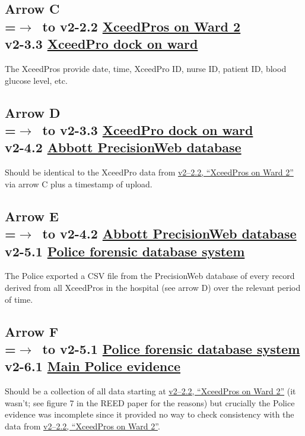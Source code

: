 \subsection*{Arrow  C\\
=\hbox{$\rightarrow$~}\hbox to v2-2.2 \hyperlink{4}{XceedPros on Ward 2}\\v2-3.3 \hyperlink{5}{XceedPro dock on ward}}
The XceedPros provide date, time, XceedPro ID, nurse ID, patient ID, blood glucose level, etc.
\subsection*{Arrow  D\\
=\hbox{$\rightarrow$~}\hbox to v2-3.3 \hyperlink{5}{XceedPro dock on ward}\\v2-4.2 \hyperlink{7}{Abbott PrecisionWeb database}}
Should be identical to the XceedPro data from \hyperlink{4}{{v2--2.2}, ``XceedPros on Ward 2''} via arrow C plus a timestamp of upload.
\subsection*{Arrow  E\\
=\hbox{$\rightarrow$~}\hbox to v2-4.2 \hyperlink{7}{Abbott PrecisionWeb database}\\v2-5.1 \hyperlink{11}{Police forensic database system}}
The Police exported a CSV file from the PrecisionWeb database of every record derived from all XceedPros in the hospital (see arrow D) over the relevant period of time. 
\subsection*{Arrow   F\\
=\hbox{$\rightarrow$~}\hbox to v2-5.1 \hyperlink{11}{Police forensic database system}\\v2-6.1 \hyperlink{12}{Main Police evidence}}
Should be a collection of all data starting at \hyperlink{4}{{v2--2.2}, ``XceedPros on Ward 2''} (it wasn't; see figure 7 in the REED paper for the reasons) but crucially the Police evidence was incomplete since it provided no way to check consistency with the data from \hyperlink{4}{{v2--2.2}, ``XceedPros on Ward 2''}.

